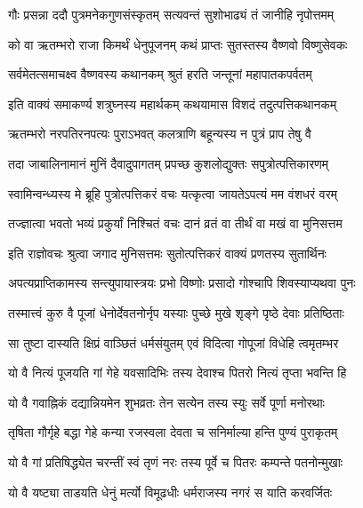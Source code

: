 \twolineshloka
{गौः प्रसन्ना ददौ पुत्रमनेकगुणसंस्कृतम्}
{सत्यवन्तं सुशोभाढ्यं तं जानीहि नृपोत्तमम्}%


\twolineshloka
{को वा ऋतम्भरो राजा किमर्थं धेनुपूजनम्}
{कथं प्राप्तः सुतस्तस्य वैष्णवो विष्णुसेवकः}%

\twolineshloka
{सर्वमेतत्समाचक्ष्व वैष्णवस्य कथानकम्}
{श्रुतं हरति जन्तूनां महापातकपर्वतम्}%


\twolineshloka
{इति वाक्यं समाकर्ण्य शत्रुघ्नस्य महार्थकम्}
{कथयामास विशदं तदुत्पत्तिकथानकम्}%

\twolineshloka
{ऋतम्भरो नरपतिरनपत्यः पुराऽभवत्}
{कलत्राणि बहून्यस्य न पुत्रं प्राप तेषु वै}%

\twolineshloka
{तदा जाबालिनामानं मुनिं दैवादुपागतम्}
{प्रपच्छ कुशलोद्युक्तः सपुत्रोत्पत्तिकारणम्}%


\twolineshloka
{स्वामिन्वन्ध्यस्य मे ब्रूहि पुत्रोत्पत्तिकरं वचः}
{यत्कृत्वा जायतेऽपत्यं मम वंशधरं वरम्}%

\twolineshloka
{तज्ज्ञात्वा भवतो भव्यं प्रकुर्यां निश्चितं वचः}
{दानं व्रतं वा तीर्थं वा मखं वा मुनिसत्तम}%

\twolineshloka
{इति राज्ञोवचः श्रुत्वा जगाद मुनिसत्तमः}
{सुतोत्पत्तिकरं वाक्यं प्रणतस्य सुतार्थिनः}%

\twolineshloka
{अपत्यप्राप्तिकामस्य सन्त्युपायास्त्रयः प्रभो}
{विष्णोः प्रसादो गोश्चापि शिवस्याप्यथवा पुनः}%

\twolineshloka
{तस्मात्त्वं कुरु वै पूजां धेनोर्देवतनोर्नृप}
{यस्याः पुच्छे मुखे शृङ्गे पृष्ठे देवाः प्रतिष्ठिताः}%

\twolineshloka
{सा तुष्टा दास्यति क्षिप्रं वाञ्छितं धर्मसंयुतम्}
{एवं विदित्वा गोपूजां विधेहि त्वमृतम्भर}%

\twolineshloka
{यो वै नित्यं पूजयति गां गेहे यवसादिभिः}
{तस्य देवाश्च पितरो नित्यं तृप्ता भवन्ति हि}%

\twolineshloka
{यो वै गवाह्निकं दद्यान्नियमेन शुभव्रतः}
{तेन सत्येन तस्य स्युः सर्वे पूर्णा मनोरथाः}%

\twolineshloka
{तृषिता गौर्गृहे बद्धा गेहे कन्या रजस्वला}
{देवता च सनिर्माल्या हन्ति पुण्यं पुराकृतम्}%

\twolineshloka
{यो वै गां प्रतिषिद्ध्येत चरन्तीं स्वं तृणं नरः}
{तस्य पूर्वे च पितरः कम्पन्ते पतनोन्मुखाः}%

\twolineshloka
{यो वै यष्ट्या ताडयति धेनुं मर्त्यो विमूढधीः}
{धर्मराजस्य नगरं स याति करवर्जितः}%

